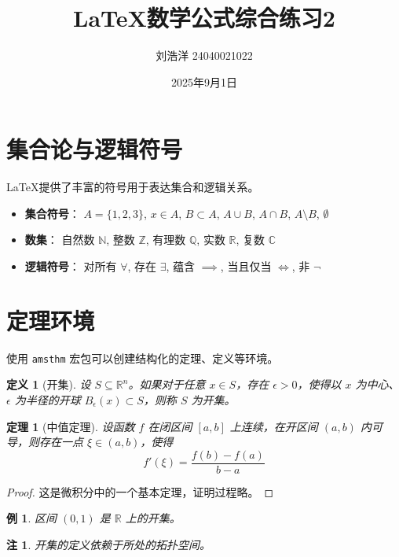 \documentclass{article}
\title{LaTeX数学公式综合练习2}
\author{刘浩洋 24040021022}
\date{2025年9月1日}
\newtheorem{theorem}{定理}[section] %
\newtheorem{definition}{定义}[section]
\newtheorem{example}{例}[section]
\newtheorem{remark}{注}[section]
\begin{document}
\maketitle

\section{集合论与逻辑符号}
LaTeX提供了丰富的符号用于表达集合和逻辑关系。

\begin{itemize}
    \item \textbf{集合符号}：
    $A = \{1, 2, 3\}$, $x \in A$, $B \subset A$, $A \cup B$, $A \cap B$, $A \setminus B$, $\emptyset$
    \item \textbf{数集}：
    自然数 $\mathbb{N}$, 整数 $\mathbb{Z}$, 有理数 $\mathbb{Q}$, 实数 $\mathbb{R}$, 复数 $\mathbb{C}$
    \item \textbf{逻辑符号}：
    对所有 $\forall$, 存在 $\exists$, 蕴含 $\implies$, 当且仅当 $\iff$, 非 $\neg$
\end{itemize}

\section{定理环境}
使用 \texttt{amsthm} 宏包可以创建结构化的定理、定义等环境。

\begin{definition}[开集]
设 $S \subseteq \mathbb{R}^n$。如果对于任意 $x \in S$，存在 $\epsilon > 0$，使得以 $x$ 为中心、$\epsilon$ 为半径的开球 $B_\epsilon(x) \subset S$，则称 $S$ 为开集。
\end{definition}

\begin{theorem}[中值定理]
设函数 $f$ 在闭区间 $[a, b]$ 上连续，在开区间 $(a, b)$ 内可导，则存在一点 $\xi \in (a, b)$，使得
\[
f'(\xi) = \frac{f(b) - f(a)}{b - a}
\]
\end{theorem}

\begin{proof}
这是微积分中的一个基本定理，证明过程略。
\end{proof}

\begin{example}
区间 $(0, 1)$ 是 $\mathbb{R}$ 上的开集。
\end{example}

\begin{remark}
开集的定义依赖于所处的拓扑空间。
\end{remark}
\end{document}
